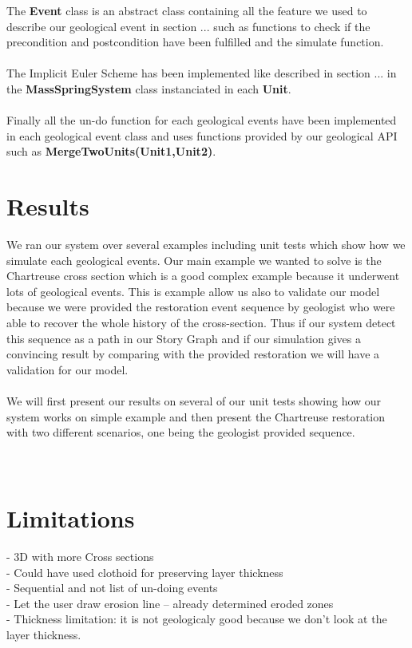 \documentclass[12pt, a4paper]{report} %
\begin{document}
The \textbf{Event} class is an abstract class containing all the feature we used to describe our geological event in section ... such as functions to check if the precondition and postcondition have been fulfilled and the simulate function.\\\\
The Implicit Euler Scheme has been implemented like described in section ... in the \textbf{MassSpringSystem} class instanciated in each \textbf{Unit}.\\\\
Finally all the un-do function for each geological events have been implemented in each geological event class and uses functions provided by our geological API such as \textbf{MergeTwoUnits(Unit1,Unit2)}. 

\chapter{Results}
We ran our system over several examples including unit tests which show how we simulate each geological events.
Our main example we wanted to solve is the Chartreuse cross section which is a good complex example because it underwent lots of geological events. This is example allow us also to validate our model because we were provided the restoration event sequence by geologist who were able to recover the whole history of the cross-section. Thus if our system detect this sequence as a path in our Story Graph and if our simulation gives a convincing result by comparing with the provided restoration we will have a validation for our model.\\\\
We will first present our results on several of our unit tests showing how our system works on simple example and then present the Chartreuse restoration with two different scenarios, one being the geologist provided sequence.\\\\\

\chapter{Limitations}

- 3D with more Cross sections\\
- Could have used clothoid for preserving layer thickness\\
- Sequential and not list of un-doing events\\
- Let the user draw erosion line -- already determined eroded zones\\
- Thickness limitation: it is not geologicaly good because we don't look at the layer thickness.
\end{document}

